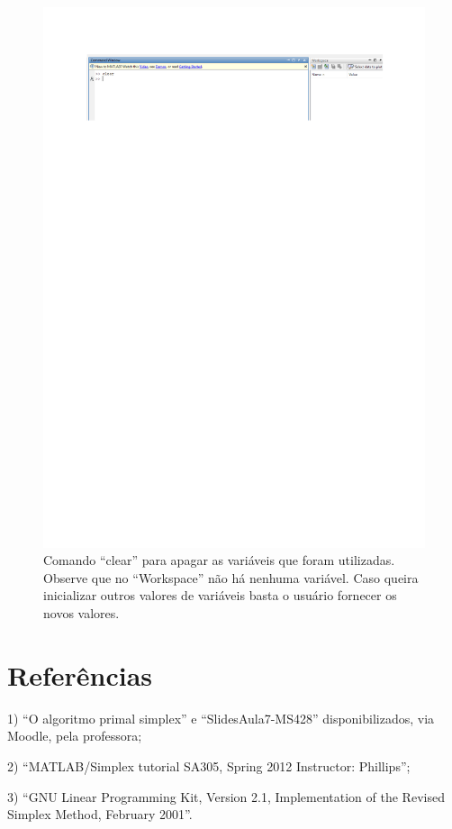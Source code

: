 \documentclass[10pt]{article}
\begin{document}
\begin{figure}[H]
    \centering
    \includegraphics[scale = 0.7]{fig9teste.pdf}
    \caption{Comando ``clear'' para apagar as variáveis que foram utilizadas. Observe que no ``Workspace'' não há nenhuma variável. Caso queira inicializar outros valores de variáveis basta o usuário fornecer os novos valores.}
\end{figure}

\section{Referências}
1) ``O algoritmo primal simplex'' e ``SlidesAula7-MS428'' disponibilizados, via Moodle, pela professora;
\newline

2) ``MATLAB/Simplex tutorial SA305, Spring 2012 Instructor: Phillips'';
\newline

3) ``GNU Linear Programming Kit, Version 2.1, Implementation of the Revised Simplex Method, February 2001''.
\end{document}
